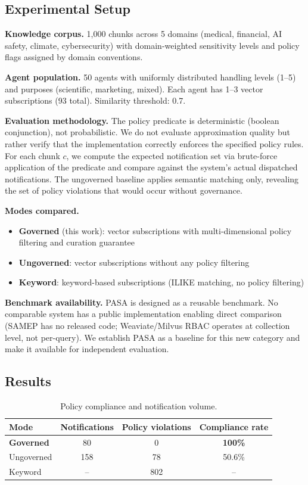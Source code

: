 \documentclass[11pt]{article}
\begin{document}
\subsection{Experimental Setup}

\textbf{Knowledge corpus.} 1,000 chunks across 5 domains (medical, financial, AI safety, climate, cybersecurity) with domain-weighted sensitivity levels and policy flags assigned by domain conventions.

\textbf{Agent population.} 50 agents with uniformly distributed handling levels (1--5) and purposes (scientific, marketing, mixed). Each agent has 1--3 vector subscriptions (93 total). Similarity threshold: 0.7.

\textbf{Evaluation methodology.} The policy predicate is deterministic (boolean conjunction), not probabilistic. We do not evaluate approximation quality but rather verify that the implementation correctly enforces the specified policy rules. For each chunk $c$, we compute the expected notification set via brute-force application of the predicate and compare against the system's actual dispatched notifications. The ungoverned baseline applies semantic matching only, revealing the set of policy violations that would occur without governance.

\textbf{Modes compared.}
\begin{itemize}[leftmargin=*]
\item \textbf{Governed} (this work): vector subscriptions with multi-dimensional policy filtering and curation guarantee
\item \textbf{Ungoverned}: vector subscriptions without any policy filtering
\item \textbf{Keyword}: keyword-based subscriptions (ILIKE matching, no policy filtering)
\end{itemize}

\textbf{Benchmark availability.} PASA is designed as a reusable benchmark. No comparable system has a public implementation enabling direct comparison (SAMEP has no released code; Weaviate/Milvus RBAC operates at collection level, not per-query). We establish PASA as a baseline for this new category and make it available for independent evaluation.

\subsection{Results}

\begin{table}[h]
\centering
\caption{Policy compliance and notification volume.}
\label{tab:compliance}
\small
\begin{tabular}{@{}lccc@{}}
\toprule
Mode & Notifications & Policy violations & Compliance rate \\
\midrule
\textbf{Governed} & 80 & 0 & \textbf{100\%} \\
Ungoverned & 158 & 78 & 50.6\% \\
Keyword & -- & 802 & -- \\
\bottomrule
\end{tabular}
\end{table}
\end{document}

